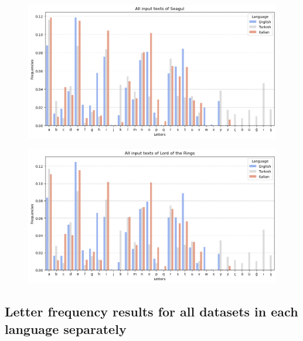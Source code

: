 \begin{figure}[h]
    \centering
    \includegraphics[width=1\textwidth]{media/allSeagul.png}
\end{figure}

\begin{figure}[h]
    \centering
    \includegraphics[width=1\textwidth]{media/allLordOfTheRings.png}
\end{figure}

\newpage

\subsection*{Letter frequency results for all datasets in each language separately} 

